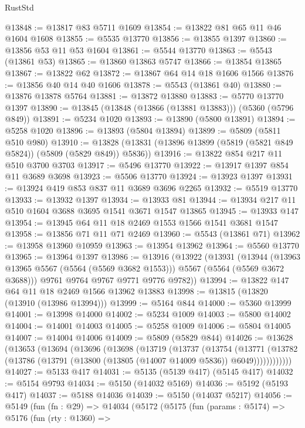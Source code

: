 \begin{lexlean}{RustStd}
\begin{coremodule}
@13848 := @13817 @83 @5711 @1609
@13854 := @13822 @81 @65 @11 @46 @1604 @1608
@13855 := @5535 @13770
@13856 := @13855 @1397
@13860 := @13856 @53 @11 @53 @1604
@13861 := @5544 @13770
@13863 := @5543 (@13861 @53)
@13865 := @13860 @13863 @5747
@13866 := @13854 @13865
@13867 := @13822 @62
@13872 := @13867 @64 @14 @18 @1606 @1566
@13876 := @13856 @40 @14 @40 @1606
@13878 := @5543 (@13861 @40)
@13880 := @13876 @13878 @5764
@13881 := @13872 @13880
@13883 := @5770 @13770 @1397
@13890 := @13845 (@13848 (@13866 (@13881 @13883))) (@5360 (@5796 @849))
@13891 := @5234 @1020
@13893 := @13890 (@5800 @13891)
@13894 := @5258 @1020
@13896 := @13893 (@5804 @13894)
@13899 := @5809 (@5811 @510 @980)
@13910 := @13828 (@13831 (@13896 @13899 (@5819 (@5821 @849 @5824)) (@5809 (@5829 @849)) @5836))
@13916 := @13822 @854 @217 @11 @510 @3700 @3703
@13917 := @5496 @13770
@13922 := @13917 @1397 @854 @11 @3689 @3698
@13923 := @5506 @13770
@13924 := @13923 @1397
@13931 := @13924 @419 @853 @837 @11 @3689 @3696 @2265
@13932 := @5519 @13770
@13933 := @13932 @1397
@13934 := @13933 @81
@13944 := @13934 @217 @11 @510 @1604 @3688 @3695 @1541 @3671 @1547 @13865
@13945 := @13933 @147
@13954 := @13945 @64 @11 @18 @2469 @1553 @1566 @1541 @3681 @1547
@13958 := @13856 @71 @11 @71 @2469
@13960 := @5543 (@13861 @71)
@13962 := @13958 @13960 @10959
@13963 := @13954 @13962
@13964 := @5560 @13770
@13965 := @13964 @1397
@13986 := @13916
    (@13922
      (@13931
        (@13944 (@13963 @13965 @5567 (@5564 (@5569 @3682 @1553))) @5567 (@5564 (@5569 @3672 @3688)))
        @9761
        @9764
        @9767
        @9771
        @9776
        @9782))
@13994 := @13822 @147 @64 @11 @18 @2469 @1566 @13962 @13883
@13998 := @13815 (@13820 (@13910 (@13986 @13994)))
@13999 := @5164 @844
@14000 := @5360 @13999
@14001 := @13998 @14000
@14002 := @5234 @1009
@14003 := @5800 @14002
@14004 := @14001 @14003
@14005 := @5258 @1009
@14006 := @5804 @14005
@14007 := @14004 @14006
@14009 := @5809 (@5829 @844)
@14026 := @13628
    (@13653
      (@13694
        (@13696
          (@13698
            (@13719
              (@13737
                (@13754
                  (@13771
                    (@13782 (@13786 (@13791 (@13800 (@13805 (@14007 @14009 @5836)) @6049))))))))))))
@14027 := @5133 @417
@14031 := @5135 (@5139 @417) (@5145 @417)
@14032 := @5154 @9793
@14034 := @5150 (@14032 @5169)
@14036 := @5192 (@5193 @417)
@14037 := @5188 @14036
@14039 := @5150 (@14037 @5217)
@14056 := @5149
    (fun (fn : @29) =>
    @14034
      (@5172
        (@5175
          (fun (params : @5174) =>
          @5176
            (fun (rty : @1360) =>

\end{coremodule}
\end{lexlean}
